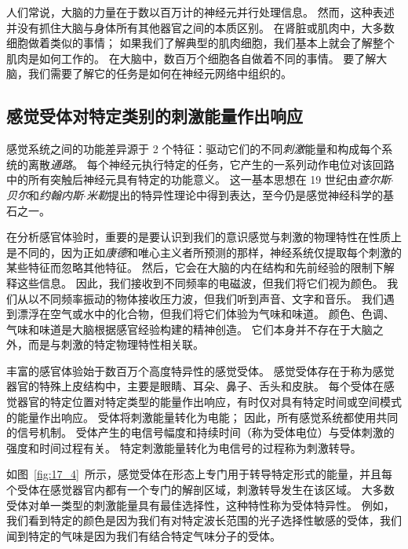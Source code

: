 人们常说，大脑的力量在于数以百万计的神经元并行处理信息。 
然而，这种表述并没有抓住大脑与身体所有其他器官之间的本质区别。 
在肾脏或肌肉中，大多数细胞做着类似的事情； 
如果我们了解典型的肌肉细胞，我们基本上就会了解整个肌肉是如何工作的。 
在大脑中，数百万个细胞各自做着不同的事情。 
要了解大脑，我们需要了解它的任务是如何在神经元网络中组织的。



\subsection{感觉受体对特定类别的刺激能量作出响应}

感觉系统之间的功能差异源于 2 个特征：驱动它们的不同\textit{刺激}能量和构成每个系统的离散\textit{通路}。
每个神经元执行特定的任务，它产生的一系列动作电位对该回路中的所有突触后神经元具有特定的功能意义。 
这一基本思想在 19 世纪由\textit{查尔斯$\cdot$贝尔}和\textit{约翰内斯$\cdot$米勒}提出的特异性理论中得到表达，至今仍是感觉神经科学的基石之一。


在分析感官体验时，重要的是要认识到我们的意识感觉与刺激的物理特性在性质上是不同的，因为正如\textit{康德}和唯心主义者所预测的那样，神经系统仅提取每个刺激的某些特征而忽略其他特征。 
然后，它会在大脑的内在结构和先前经验的限制下解释这些信息。 
因此，我们接收到不同频率的电磁波，但我们将它们视为颜色。 
我们从以不同频率振动的物体接收压力波，但我们听到声音、文字和音乐。 
我们遇到漂浮在空气或水中的化合物，但我们将它们体验为气味和味道。 
颜色、色调、气味和味道是大脑根据感官经验构建的精神创造。 
它们本身并不存在于大脑之外，而是与刺激的特定物理特性相关联。


丰富的感官体验始于数百万个高度特异性的感觉受体。 
感觉受体存在于称为感觉器官的特殊上皮结构中，主要是眼睛、耳朵、鼻子、舌头和皮肤。 
每个受体在感觉器官的特定位置对特定类型的能量作出响应，有时仅对具有特定时间或空间模式的能量作出响应。 
受体将刺激能量转化为电能； 
因此，所有感觉系统都使用共同的信号机制。 
受体产生的电信号幅度和持续时间（称为受体电位）与受体刺激的强度和时间过程有关。
特定刺激能量转化为电信号的过程称为刺激转导。


如图~\ref{fig:17_4}~所示，感觉受体在形态上专门用于转导特定形式的能量，并且每个受体在感觉器官内都有一个专门的解剖区域，刺激转导发生在该区域。 
大多数受体对单一类型的刺激能量具有最佳选择性，这种特性称为受体特异性。
例如，我们看到特定的颜色是因为我们有对特定波长范围的光子选择性敏感的受体，我们闻到特定的气味是因为我们有结合特定气味分子的受体。



